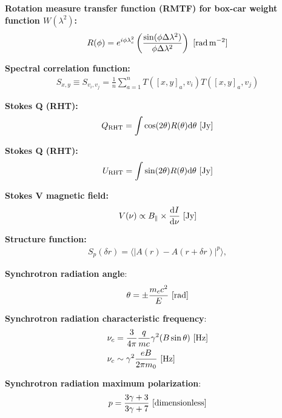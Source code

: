 \documentclass[a4paper,11pt]{article}
\begin{document}
{\noindent}\textbf{Rotation measure transfer function (RMTF) for box-car weight function $W(\lambda^2)$:}
\begin{align*}
    R(\phi) = e^{i\phi\lambda_c^2}\left(\dfrac{\sin(\phi\Delta\lambda^2)}{\phi\Delta\lambda^2}\right) ~ [{\rm rad\,m^{-2}}]
\end{align*}

{\noindent}\textbf{Spectral correlation function:}
\begin{align*}
    S_{x,y} \equiv S_{v_i,v_j} = \frac{1}{n}\sum_{a=1}^n T([x,y]_a,v_i)T([x,y]_a,v_j)
\end{align*}

{\noindent}\textbf{Stokes Q (RHT):}
\begin{align*}
    Q_\mathrm{RHT} = \int\cos(2\theta)R(\theta)\mathrm{d}\theta ~ [{\rm Jy}]
\end{align*}

{\noindent}\textbf{Stokes Q (RHT):}
\begin{align*}
    U_\mathrm{RHT} = \int\sin(2\theta)R(\theta)\mathrm{d}\theta ~ [{\rm Jy}]
\end{align*}

{\noindent}\textbf{Stokes V magnetic field:}
\begin{align*}
    V(\nu) \propto B_\parallel \times \frac{\mathrm{d}I}{\mathrm{d}\nu} ~ [\rm Jy]
\end{align*}

{\noindent}\textbf{Structure function:}
\begin{align*}
    S_p(\delta r) = \langle\lvert A(r)-A(r+\delta r)\rvert^p\rangle,
\end{align*}

{\noindent}\textbf{Synchrotron radiation angle}:
\begin{align*}
\theta = \pm \frac{m_cc^2}{E} ~ [\rm rad]
\end{align*}

{\noindent}\textbf{Synchrotron radiation characteristic frequency}:
\begin{align*}
\nu_c &= \dfrac{3}{4\pi}\dfrac{q}{mc}\gamma^2(B\sin\theta)~[{\rm Hz}] \\
\nu_c &\sim \gamma^2 \frac{eB}{2\pi m_0} ~ [{\rm Hz}]
\end{align*}

{\noindent}\textbf{Synchrotron radiation maximum polarization}:
\begin{align*}
p = \frac{3\gamma + 3}{3\gamma+7} ~ [{\rm dimensionless}]
\end{align*}
\end{document}
